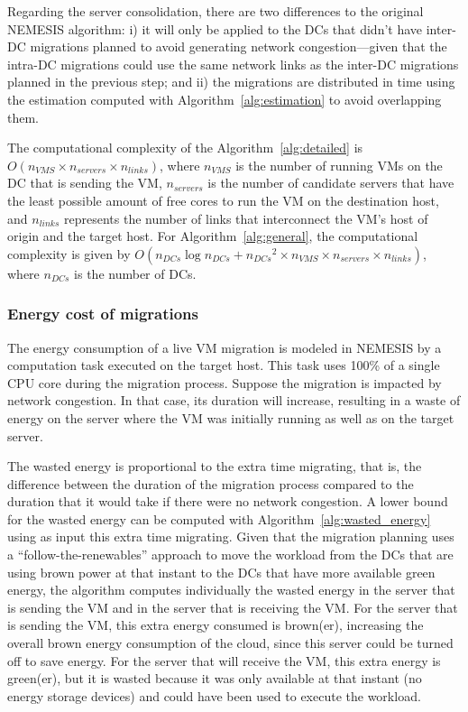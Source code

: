 Regarding the server consolidation, there are two differences to the original NEMESIS algorithm: i) it will only be applied to the DCs that didn't have inter-DC migrations planned to avoid generating network congestion---given that the intra-DC migrations could use the same network links as the inter-DC migrations planned in the previous step; and ii) the migrations are distributed in time using the estimation computed with Algorithm~\ref{alg:estimation} to avoid overlapping them.


The computational complexity of the Algorithm~\ref{alg:detailed} is $O(n_{VMS} \times  n_{servers} \times n_{links}  )$, where $n_{VMS}$ is the number of running VMs on the DC that is sending the VM, $n_{servers}$ is the number of candidate servers that have the least possible amount of free cores to run the VM on the destination host, and $n_{links}$ represents the number of links that interconnect the VM's host of origin and the target host. For Algorithm~\ref{alg:general}, the computational complexity is given by $O(n_{DCs}\log{}n_{DCs} + {n_{DCs}}^{2} \times n_{VMS} \times  n_{servers} \times n_{links})$, where $n_{DCs}$ is the number of DCs.

\subsubsection{Energy cost of migrations}\label{sec:energy_costs_mig}

The energy consumption of a live VM migration is modeled in NEMESIS by a computation task executed on the target host. This task uses 100\% of a single CPU core during the migration process. Suppose the migration is impacted by network congestion. In that case, its duration will increase, resulting in a waste of energy on the server where the VM was initially running as well as on the target server.


The wasted energy is proportional to the extra time migrating, that is, the difference between the duration of the migration process compared to the duration that it would take if there were no network congestion. A lower bound for the wasted energy can be computed with Algorithm~\ref{alg:wasted_energy} using as input this extra time migrating. Given that the migration planning uses a ``follow-the-renewables'' approach to move the workload from the DCs that are using brown power at that instant to the DCs that have more available green energy, the algorithm computes individually the wasted energy in the server that is sending the VM and in the server that is receiving the VM. For the server that is sending the VM, this extra energy consumed is brown(er), increasing the overall brown energy consumption of the cloud, since this server could be turned off to save energy. For the server that will receive the VM, this extra energy is green(er), but it is wasted because it was only available at that instant (no energy storage devices) and could have been used to execute the workload.

